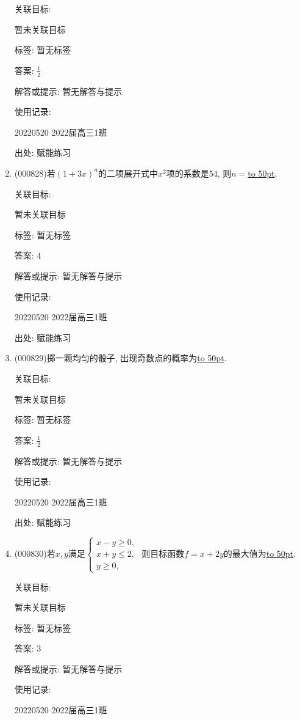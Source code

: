 \documentclass[10pt,a4paper]{article}
\newcommand{\blank}[1]{\underline{\hbox to #1pt{}}}
\begin{document}
\begin{enumerate}[1.]
关联目标:

暂未关联目标



标签: 暂无标签

答案: $\frac 12$

解答或提示: 暂无解答与提示

使用记录:

20220520	2022届高三1班	


出处: 赋能练习
\item { (000828)}若$(1+3x)^n$的二项展开式中$x^2$项的系数是$54$, 则$n=$\blank{50}.


关联目标:

暂未关联目标



标签: 暂无标签

答案: $4$

解答或提示: 暂无解答与提示

使用记录:

20220520	2022届高三1班	


出处: 赋能练习
\item { (000829)}掷一颗均匀的骰子, 出现奇数点的概率为\blank{50}.


关联目标:

暂未关联目标



标签: 暂无标签

答案: $\frac 12$

解答或提示: 暂无解答与提示

使用记录:

20220520	2022届高三1班	


出处: 赋能练习
\item { (000830)}若$x,y$满足$\begin{cases} x-y\ge 0, \\ x+y\le 2, \\ y\ge 0, \end{cases}$ 则目标函数$f=x+2y$的最大值为\blank{50}.


关联目标:

暂未关联目标



标签: 暂无标签

答案: $3$

解答或提示: 暂无解答与提示

使用记录:

20220520	2022届高三1班	



\end{enumerate}
\end{document}
